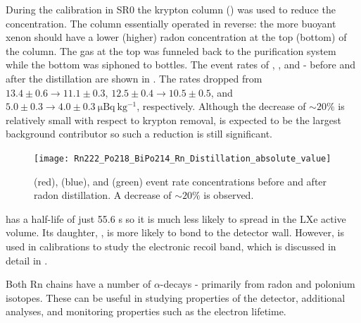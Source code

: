 During the  calibration in SR0 the krypton column () was used to reduce the 
concentration.  The column essentially operated in reverse: the more buoyant xenon should have a lower (higher) radon concentration at the
top (bottom) of the column.  The gas at the top was funneled back to the purification system while the bottom was siphoned to
bottles.  The event rates of , , and - before and after the distillation are shown
in .  The rates dropped from $13.4 \pm 0.6 \rightarrow 11.1 \pm 0.3$,
$12.5 \pm 0.4 \rightarrow 10.5 \pm 0.5$, and $5.0 \pm 0.3 \rightarrow 4.0 \pm 0.3\ \mathrm{\mu Bq\ kg^{-1}}$, respectively.  Although the
decrease of ${\sim}20\%$ is relatively small with respect to krypton removal,  is expected to be the largest background
contributor so such a reduction is still significant.

\begin{figure}
\centering
\texttt{[image: Rn222\_Po218\_BiPo214\_Rn\_Distillation\_absolute\_value]}
\label{fig:backgrounds_electronic_radon_distillation}
\caption{ (red),  (blue), and  (green) event rate concentrations before and after radon
distillation.  A decrease of ${\sim} 20\%$ is observed.}
\end{figure}

 has a half-life of just 55.6 s so it is much less likely to spread in the LXe active volume.  Its daughter, ,
is more likely to bond to the detector wall.  However,  is used in calibrations to study the electronic recoil band, which is
discussed in detail in .

Both Rn chains have a number of $\alpha$-decays - primarily from radon and polonium isotopes.  These can be useful in studying properties
of the detector, additional analyses, and monitoring properties such as the electron lifetime.

